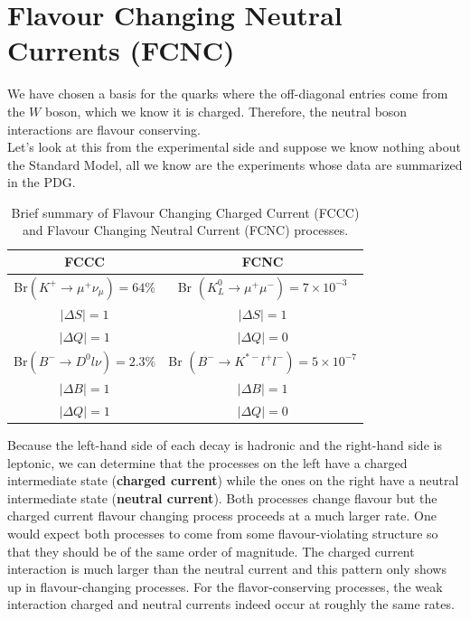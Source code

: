 \documentclass[../main.tex]{subfiles}
\begin{document}
\section{Flavour Changing Neutral Currents (FCNC)}
We have chosen a basis for the quarks where the off-diagonal entries come from the $W$ boson, which we know it is charged. Therefore, the neutral boson interactions are flavour conserving.\\
Let's look at this from the experimental side and suppose we know nothing about the Standard Model, all we know are the experiments whose data are summarized in the PDG\cite{pdg}.
\begin{table}[h]
    \centering
    \begin{tabular}{c|c}
    \hline
    \rowcolor{gray!45}FCCC & FCNC\\
    \hline
    Br$(K^+\xrightarrow[]{}\mu^+\nu_\mu)=64\%$ & Br $(K_L^0\xrightarrow[]{}\mu^+\mu^-)=7\times10^{-3}$\\
    $|\Delta S|=1$ & $|\Delta S|=1$\\
    $|\Delta Q|=1$ & $|\Delta Q|=0$\\
    \hline
    Br$(B^-\xrightarrow[]{}D^0l\nu)=2.3\%$ & Br $(B^-\xrightarrow[]{}K^{*-}l^+l^-)=5\times10^{-7}$\\
    $|\Delta B|=1$ & $|\Delta B|=1$\\
    $|\Delta Q|=1$ & $|\Delta Q|=0$\\
    \hline
    \end{tabular}
    \caption{Brief summary of Flavour Changing Charged Current (FCCC) and Flavour Changing Neutral Current (FCNC) processes.}
\end{table}
\newline
Because the left-hand side of each decay is hadronic and the right-hand side is leptonic, we can determine that the processes on the left have a charged intermediate state (\textbf{charged current}) while the ones on the right have a neutral intermediate state (\textbf{neutral current}). Both processes change flavour but the charged current flavour changing process proceeds at a much larger rate. One would expect both processes to come from some flavour-violating structure so that they should be of the same order of magnitude. The charged current interaction is much larger than the neutral current and this pattern only shows up in flavour-changing processes. For the flavor-conserving processes, the weak interaction charged and neutral currents indeed occur at roughly the same rates.
\end{document}
